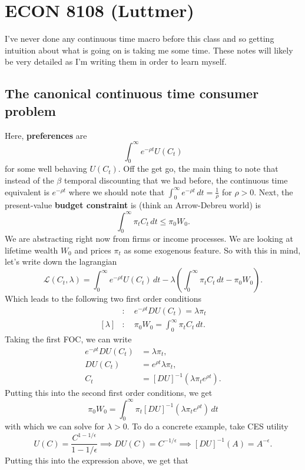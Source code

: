 \documentclass[11pt,english]{article}
\begin{document}
\section{ECON 8108 (Luttmer)}
I've never done any continuous time macro before this class and so getting intuition about what is going on is taking me some time. These notes will likely be very detailed as I'm writing them in order to learn myself.

\subsection{The canonical continuous time consumer problem}
Here, \textbf{preferences} are $$\int_0^\infty e^{-\rho t}U(C_t)$$ for some well behaving $U(C_t)$. Off the get go, the main thing to note that instead of the $\beta$ temporal discounting that we had before, the continuous time equivalent is $e^{-\rho t}$ where we should note that $\int_0^\infty e^{-\rho t}\,dt = \frac{1}{\rho}$ for $\rho > 0$. Next, the present-value \textbf{budget constraint} is (think an Arrow-Debreu world) is $$\int_0^\infty\pi_tC_t\,dt\leq \pi_0 W_0.$$ We are abstracting right now from firms or income processes. We are looking at lifetime wealth $W_0$ and prices $\pi_t$ as some exogenous feature. So with this in mind, let's write down the lagrangian 
$$\mathcal{L}(C_t, \lambda) = \int_0^\infty e^{-\rho t}U(C_t)\,dt - \lambda\left(\int_0^\infty \pi_t C_t\,dt - \pi_0W_0\right).$$ Which leads to the following two first order conditions
\begin{align*}
[C_t]&:\quad e^{-\rho t}DU(C_t) = \lambda\pi_t \\
[\lambda]&:\quad  \pi_0W_0 = \int_0^\infty \pi_tC_t\,dt.
\end{align*}
Taking the first FOC, we can write \begin{align*}
e^{-\rho t}DU(C_t) &= \lambda\pi_t,\\
DU(C_t) &= e^{\rho t}\lambda\pi_t,\\
C_t &= [DU]^{-1}\left(\lambda\pi_te^{\rho t}\right).
\end{align*} Putting this into the second first order conditions, we get $$\pi_0W_0 = \int_0^\infty \pi_t[DU]^{-1}\left(\lambda\pi_te^{\rho t}\right)\,dt$$ with which we can solve for $\lambda > 0$. To do a concrete example, take CES utility $$U(C) = \frac{C^{1 - 1/\epsilon}}{1 - 1/\epsilon} \implies DU(C) = C^{-1/\epsilon} \implies [DU]^{-1}(A) = A^{-\epsilon}.$$ Putting this into the expression above, we get that 
\end{document}
